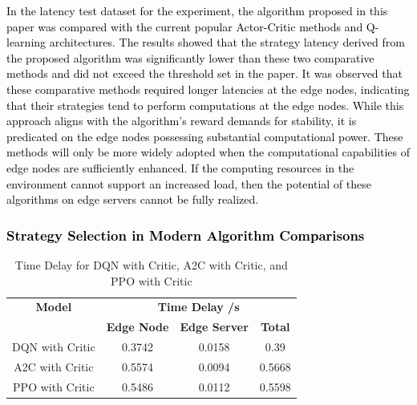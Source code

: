 \documentclass[preprint,12pt]{elsarticle}
\begin{document}
\textcolor{black}{In the latency test dataset for the experiment, the algorithm proposed in this paper was compared with the current popular Actor-Critic methods and Q-learning architectures. The results showed that the strategy latency derived from the proposed algorithm was significantly lower than these two comparative methods and did not exceed the threshold set in the paper. It was observed that these comparative methods required longer latencies at the edge nodes, indicating that their strategies tend to perform computations at the edge nodes. While this approach aligns with the algorithm's reward demands for stability, it is predicated on the edge nodes possessing substantial computational power. These methods will only be more widely adopted when the computational capabilities of edge nodes are sufficiently enhanced. If the computing resources in the environment cannot support an increased load, then the potential of these algorithms on edge servers cannot be fully realized.}

\textcolor{black}{\subsubsection{Strategy Selection in Modern Algorithm Comparisons}}

\begin{table}[ht!]
\centering
\begin{tabular}{c c c c}
\hline
\textbf{Model} & \multicolumn{3}{c}{\textbf{Time Delay /s}} \\
& \textbf{Edge Node} & \textbf{Edge Server} & \textbf{Total} \\
\hline
DQN with Critic & 0.3742 & 0.0158 & 0.39 \\
A2C with Critic & 0.5574 & 0.0094 & 0.5668   \\
PPO with Critic & 0.5486 & 0.0112 & 0.5598 \\
\hline
\end{tabular}
\caption{Time Delay for DQN with Critic, A2C with Critic, and PPO with Critic}
\label{tab:table 10}
\end{table}
\end{document}
